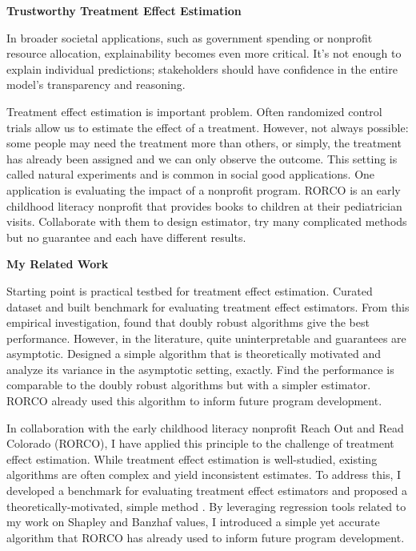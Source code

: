 \documentclass[11pt]{article}
\begin{document}
{\begin{center}
    { \large \textbf{Trustworthy Treatment Effect Estimation}}    
\end{center}

In broader societal applications, such as government spending or nonprofit resource allocation, explainability becomes even more critical. It’s not enough to explain individual predictions; stakeholders should have confidence in the entire model’s transparency and reasoning. 

Treatment effect estimation is important problem.
Often randomized control trials allow us to estimate the effect of a treatment.
However, not always possible: some people may need the treatment more than others, or simply, the treatment has already been assigned and we can only observe the outcome.
This setting is called natural experiments and is common in social good applications.
One application is evaluating the impact of a nonprofit program.
RORCO is an early childhood literacy nonprofit that provides books to children at their pediatrician visits.
Collaborate with them to design estimator, try many complicated methods but no guarantee and each have different results.


{ \large \textbf{My Related Work}}

Starting point is practical testbed for treatment effect estimation.
Curated dataset and built benchmark for evaluating treatment effect estimators.
From this empirical investigation, found that doubly robust algorithms give the best performance.
However, in the literature, quite uninterpretable and guarantees are asymptotic.
Designed a simple algorithm that is theoretically motivated and analyze its variance in the asymptotic setting, exactly.
Find the performance is comparable to the doubly robust algorithms but with a simpler estimator.
RORCO already used this algorithm to inform future program development.

In collaboration with the early childhood literacy nonprofit Reach Out and Read Colorado (RORCO), I have applied this principle to the challenge of treatment effect estimation. While treatment effect estimation is well-studied, existing algorithms are often complex and yield inconsistent estimates. To address this, I developed a benchmark for evaluating treatment effect estimators and proposed a theoretically-motivated, simple method \cite{witter2024benchmarking}. By leveraging regression tools related to my work on Shapley and Banzhaf values, I introduced a simple yet accurate algorithm that RORCO has already used to inform future program development.

}
\end{document}
